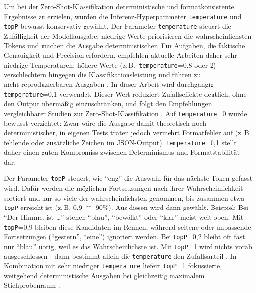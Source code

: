 Um bei der Zero‑Shot‑Klassifikation deterministische und formatkonsistente Ergebnisse zu erzielen, wurden die Inferenz‑Hyperparameter \texttt{temperature} und \texttt{topP} bewusst konservativ gewählt. Der Parameter \texttt{temperature} steuert die Zufälligkeit der Modellausgabe: niedrige Werte priorisieren die wahrscheinlichsten Tokens und machen die Ausgabe deterministischer. Für Aufgaben, die faktische Genauigkeit und Precision erfordern, empfehlen aktuelle Arbeiten daher sehr niedrige Temperaturen; höhere Werte (z.\,B.\ \texttt{temperature}=0{,}8 oder 2) verschlechtern hingegen die Klassifikationsleistung und führen zu nicht‑reproduzierbaren Ausgaben \cite{mu2024navigating,renze2024effect}. In dieser Arbeit wird durchgängig \texttt{temperature}=0{,}1 verwendet. Dieser Wert reduziert Zufallseffekte deutlich, ohne den Output übermäßig einzuschränken, und folgt den Empfehlungen vergleichbarer Studien zur Zero-Shot-Klassifikation \cite{mu2024navigating}. Auf \texttt{temperature}=0 wurde bewusst verzichtet: Zwar wäre die Ausgabe damit theoretisch noch deterministischer, in eigenen Tests traten jedoch vermehrt Formatfehler auf (z.\,B. fehlende oder zusätzliche Zeichen im JSON-Output). \texttt{temperature}=0{,}1 stellt daher einen guten Kompromiss zwischen Determinismus und Formatstabilität dar.

Der Parameter \texttt{topP} steuert, wie \enquote{eng} die Auswahl für das nächste Token gefasst wird. Dafür werden die möglichen Fortsetzungen nach ihrer Wahrscheinlichkeit sortiert und nur so viele der wahrscheinlichsten genommen, bis zusammen etwa \texttt{topP} erreicht ist (z.\,B. 0{,}9 $\widehat{=}$ 90\%). Aus diesen wird dann gewählt. Beispiel: Bei \enquote{Der Himmel ist \dots} stehen \enquote{blau}, \enquote{bewölkt} oder \enquote{klar} meist weit oben. Mit \texttt{topP}=0{,}9 bleiben diese Kandidaten im Rennen, während seltene oder unpassende Fortsetzungen (\enquote{gestern}, \enquote{eine}) ignoriert werden. Bei \texttt{topP}=0{,}2 bleibt oft fast nur \enquote{blau} übrig, weil es das Wahrscheinlichste ist. Mit \texttt{topP}=1 wird nichts vorab ausgeschlossen - dann bestimmt allein die \texttt{temperature} den Zufallsanteil \cite{renze2024effect}. In Kombination mit sehr niedriger \texttt{temperature} liefert \texttt{topP}=1 fokussierte, weitgehend deterministische Ausgaben bei gleichzeitig maximalem Stichprobenraum \cite{mu2024navigating}.